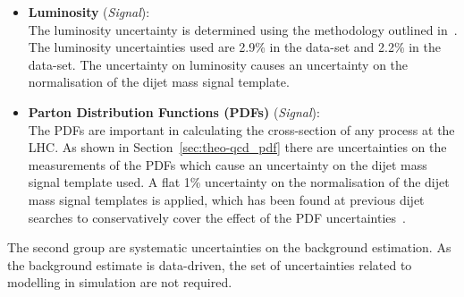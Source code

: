 \begin{itemize}[leftmargin=*]
  The uncertainty on the $b$-jet trigger scale factors cause an uncertainty on the normalisation of each point in the dijet mass signal template.
  This systematic uncertainty is only used in the \lm{} data-set, as this is the only data-set using a $b$-jet trigger.
  \vspace{0.5em}
  \newpage
\item\textbf{Luminosity} \hspace{1mm} (\textit{Signal}):\\
  The luminosity uncertainty is determined using the methodology outlined in~\cite{lim-syst_lumi}.
  The luminosity uncertainties used are 2.9\% in the \summer{} data-set and 2.2\% in the \lm{} data-set.
  The uncertainty on luminosity causes an uncertainty on the normalisation of the dijet mass signal template.
  \vspace{0.5em}
\item\textbf{Parton Distribution Functions (PDFs) } \hspace{1mm}  (\textit{Signal}):\\
  The PDFs are important in calculating the cross-section of any process at the LHC.
  As shown in Section~\ref{sec:theo-qcd_pdf} there are uncertainties on the measurements of the PDFs
  which cause an uncertainty on the dijet mass signal template used.
  A flat 1\% uncertainty on the normalisation of the dijet mass signal templates is applied,
  which has been found at previous dijet searches to conservatively cover
  the effect of the PDF uncertainties~\cite{dijet-mori16_paper,dijet-isr}.
  \vspace{0.5em}
\end{itemize}

The second group are systematic uncertainties on the background estimation.
As the background estimate is data-driven, the set of uncertainties related to modelling in simulation are not required.

